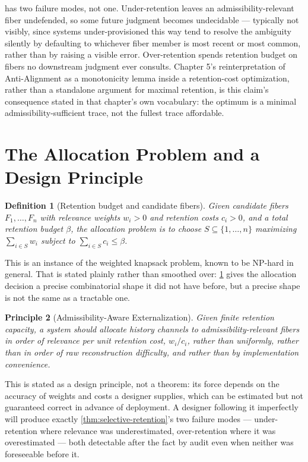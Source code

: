 \documentclass[12pt]{report}
\newtheorem{definition}{Definition}[section]
\newtheorem{principle}[definition]{Principle}
\begin{document}
 has two failure modes, not one.
Under-retention leaves an admissibility-relevant fiber undefended, so
some future judgment becomes undecidable --- typically not visibly, since
systems under-provisioned this way tend to resolve the ambiguity silently
by defaulting to whichever fiber member is most recent or most common,
rather than by raising a visible error. Over-retention spends retention
budget on fibers no downstream judgment ever consults. Chapter 5's
reinterpretation of Anti-Alignment as a monotonicity lemma inside a
retention-cost optimization, rather than a standalone argument for
maximal retention, is this claim's consequence stated in that chapter's
own vocabulary: the optimum is a minimal admissibility-sufficient trace,
not the fullest trace affordable.

\section{The Allocation Problem and a Design Principle}
\label{sec:allocation}

\begin{definition}[Retention budget and candidate fibers]
\label{def:allocation-problem}
Given candidate fibers $F_1,\ldots,F_n$ with relevance weights $w_i > 0$
and retention costs $c_i > 0$, and a total retention budget $\beta$, the
allocation problem is to choose $S \subseteq \{1,\ldots,n\}$ maximizing
$\sum_{i \in S} w_i$ subject to $\sum_{i \in S} c_i \leq \beta$.
\end{definition}

This is an instance of the weighted knapsack problem, known to be
NP-hard in general. That is stated plainly rather than smoothed over:
\cref{def:allocation-problem} gives the allocation decision a precise
combinatorial shape it did not have before, but a precise shape is not
the same as a tractable one.

\begin{principle}[Admissibility-Aware Externalization]
\label{princ:admissibility-aware}
Given finite retention capacity, a system should allocate history
channels to admissibility-relevant fibers in order of relevance per unit
retention cost, $w_i / c_i$, rather than uniformly, rather than in order
of raw reconstruction difficulty, and rather than by implementation
convenience.
\end{principle}

This is stated as a design principle, not a theorem: its force depends
on the accuracy of weights and costs a designer supplies, which can be
estimated but not guaranteed correct in advance of deployment. A designer
following it imperfectly will produce exactly \cref{thm:selective-retention}'s
two failure modes --- under-retention where relevance was underestimated,
over-retention where it was overestimated --- both detectable after the
fact by audit even when neither was foreseeable before it.
\end{document}
